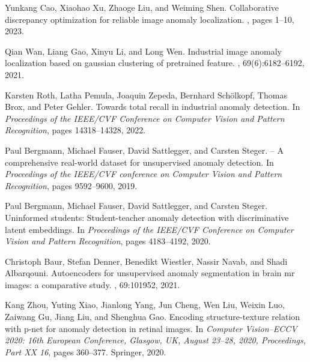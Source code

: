 \documentclass{article}
\begin{document}
{\small





\begin{thebibliography}{10}

Yunkang Cao, Xiaohao Xu, Zhaoge Liu, and Weiming Shen.
\newblock Collaborative discrepancy optimization for reliable image anomaly
  localization.
, pages 1--10, 2023.

Qian Wan, Liang Gao, Xinyu Li, and Long Wen.
\newblock Industrial image anomaly localization based on gaussian clustering of
  pretrained feature.
, 69(6):6182--6192,
  2021.

Karsten Roth, Latha Pemula, Joaquin Zepeda, Bernhard Sch{\"o}lkopf, Thomas
  Brox, and Peter Gehler.
\newblock Towards total recall in industrial anomaly detection.
\newblock In {\em Proceedings of the IEEE/CVF Conference on Computer Vision and
  Pattern Recognition}, pages 14318--14328, 2022.

Paul Bergmann, Michael Fauser, David Sattlegger, and Carsten Steger.
 -- {A} comprehensive real-world dataset for unsupervised
  anomaly detection.
\newblock In {\em Proceedings of the IEEE/CVF conference on Computer Vision and
  Pattern Recognition}, pages 9592--9600, 2019.

Paul Bergmann, Michael Fauser, David Sattlegger, and Carsten Steger.
\newblock Uninformed students: Student-teacher anomaly detection with
  discriminative latent embeddings.
\newblock In {\em Proceedings of the IEEE/CVF Conference on Computer Vision and
  Pattern Recognition}, pages 4183--4192, 2020.

Christoph Baur, Stefan Denner, Benedikt Wiestler, Nassir Navab, and Shadi
  Albarqouni.
\newblock Autoencoders for unsupervised anomaly segmentation in brain mr
  images: a comparative study.
, 69:101952, 2021.

Kang Zhou, Yuting Xiao, Jianlong Yang, Jun Cheng, Wen Liu, Weixin Luo, Zaiwang
  Gu, Jiang Liu, and Shenghua Gao.
\newblock Encoding structure-texture relation with p-net for anomaly detection
  in retinal images.
\newblock In {\em Computer Vision--ECCV 2020: 16th European Conference,
  Glasgow, UK, August 23--28, 2020, Proceedings, Part XX 16}, pages 360--377.
  Springer, 2020.


\end{thebibliography}}
\end{document}
